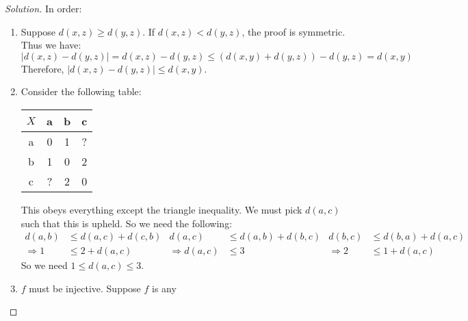 \documentclass[crop=false,class=article,oneside]{standalone}
\begin{document}
        \begin{proof}[Solution]
            In order:
            \begin{enumerate}
                \item Suppose $d(x,z)\geq{d(y,z)}$.
                      If $d(x,z)<d(y,z)$, the proof is
                      symmetric. Thus we have:
                      \begin{equation*}
                          |d(x,z)-d(y,z)|=d(x,z)-d(y,z)
                          \leq{(d(x,y)+d(y,z))-d(y,z)}
                          =d(x,y)
                      \end{equation*}
                      Therefore,
                      $|d(x,z)-d(y,z)|\leq{d(x,y)}$.
                \item Consider the following table:
                      \begin{table}[H]
                          \captionsetup{type=table}
                          \centering
                          \begin{tabular}{|c|c|c|c|}
                              \hline
                              $X$&a&b&c\\
                              \hline
                              a&0&1&?\\
                              \hline
                              b&1&0&2\\
                              \hline
                              c&?&2&0\\
                              \hline
                          \end{tabular}
                      \end{table}
                      This obeys everything except the triangle
                      inequality. We must pick $d(a,c)$
                      such that this is upheld.
                      So we need the following:
                      \begin{align*}
                          d(a,b)&\leq{d(a,c)+d(c,b)}&
                          d(a,c)&\leq{d(a,b)+d(b,c)}&
                          d(b,c)&\leq{d(b,a)+d(a,c)}\\
                          \Rightarrow{1}&\leq{2+d(a,c)}&
                          \Rightarrow{d(a,c)}&\leq{3}&
                          \Rightarrow{2}&\leq{1+d(a,c)}
                      \end{align*}
                      So we need $1\leq{d(a,c)}\leq{3}$.
                \item $f$ must be injective. Suppose $f$ is any

\end{enumerate}
\end{proof}
\end{document}
